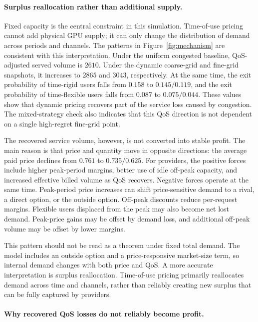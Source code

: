 \documentclass[11pt,a4paper]{article}
\begin{document}
\paragraph{Surplus reallocation rather than additional supply.}

Fixed capacity is the central constraint in this simulation. Time-of-use pricing cannot add physical GPU supply; it can only change the distribution of demand across periods and channels. The patterns in Figure~\ref{fig:mechanism} are consistent with this interpretation. Under the uniform congested baseline, QoS-adjusted served volume is $2610$. Under the dynamic coarse-grid and fine-grid snapshots, it increases to $2865$ and $3043$, respectively. At the same time, the exit probability of time-rigid users falls from $0.158$ to $0.145/0.119$, and the exit probability of time-flexible users falls from $0.087$ to $0.075/0.044$. These values show that dynamic pricing recovers part of the service loss caused by congestion. The mixed-strategy check also indicates that this QoS direction is not dependent on a single high-regret fine-grid point.

The recovered service volume, however, is not converted into stable profit. The main reason is that price and quantity move in opposite directions: the average paid price declines from $0.761$ to $0.735/0.625$. For providers, the positive forces include higher peak-period margins, better use of idle off-peak capacity, and increased effective billed volume as QoS recovers. Negative forces operate at the same time. Peak-period price increases can shift price-sensitive demand to a rival, a direct option, or the outside option. Off-peak discounts reduce per-request margins. Flexible users displaced from the peak may also become net lost demand. Peak-price gains may be offset by demand loss, and additional off-peak volume may be offset by lower margins.

This pattern should not be read as a theorem under fixed total demand. The model includes an outside option and a price-responsive market-size term, so internal demand changes with both price and QoS. A more accurate interpretation is surplus reallocation. Time-of-use pricing primarily reallocates demand across time and channels, rather than reliably creating new surplus that can be fully captured by providers.

\paragraph{Why recovered QoS losses do not reliably become profit.}
\end{document}
